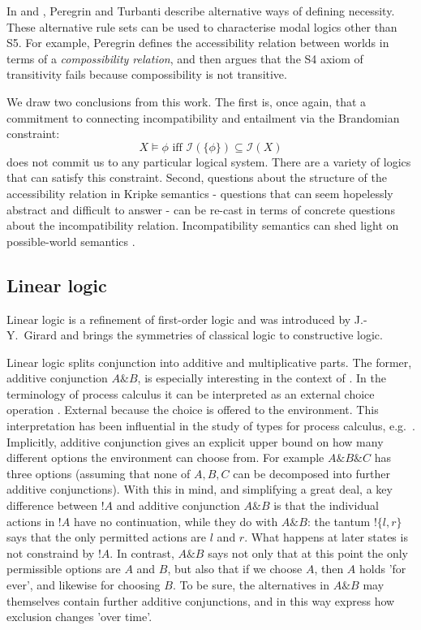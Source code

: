 In \cite{PeregrinJ:logbasoi} and \cite{turbanti}, Peregrin and Turbanti describe alternative ways of defining necessity.
These alternative rule sets can be used to characterise modal logics other than S5.
For example, Peregrin defines the accessibility relation between worlds in terms of a \emph{compossibility relation}, and then argues that the S4 axiom of transitivity fails because compossibility is not transitive.

We draw two conclusions from this work.
The first is, once again, that a commitment to connecting incompatibility and entailment via the Brandomian constraint:
\[
X \models \phi \text{ iff } \mathcal{I}(\{\phi\}) \subseteq \mathcal{I}(X)
\]
does not commit us to any particular logical system. 
There are a variety of logics that can satisfy this constraint.
Second, questions about the structure of the accessibility relation in Kripke semantics - questions that can seem hopelessly abstract and difficult to answer - can be re-cast in terms of concrete questions about the incompatibility relation.
Incompatibility semantics can shed light on possible-world semantics \cite{turbanti}. 

\subsection{Linear logic}

Linear logic \cite{GirardJY:linlog,GirardJY:protyp} is a refinement of
first-order logic and was introduced by J.-Y.~Girard and
brings the symmetries of classical logic to constructive
logic. 

Linear logic splits conjunction into additive and multiplicative
parts. The former, additive conjunction $A \& B$, is especially
interesting in the context of \cathoristic{}. In the terminology of
process calculus it can be interpreted as an external choice operation
\cite{AbramskyS:comintoll}. External because the choice is offered to
the environment.  This interpretation has been influential in the
study of types for process calculus,
e.g.~\cite{HondaK:unitypsfsifLONG,TakeuchiK:intbaslaits,HondaK:lanpriatdfscbp}.
Implicitly, additive conjunction gives an explicit upper bound on how
many different options the environment can choose from. For example 
$A \& B \& C$ has  three options (assuming that none of $A, B, C$
can be decomposed into further additive conjunctions).  With this in
mind, and simplifying a great deal, a key difference between $!A$ and
additive conjunction $A \& B$ is that the individual actions in $!A$
have no continuation, while they do with $A \& B$: the tantum $!\{l, r\}$ says
that the only permitted  actions are $l$ and $r$. What
happens at later states is not constraind by $!A$.  In contrast, $A \&
B$ says not only that at this point the only permissible options are $A$
and $B$, but also that if we choose $A$, then $A$ holds 'for ever',
and likewise for choosing $B$. To be sure, the alternatives in $A \&
B$ may themselves contain further additive conjunctions, and in this
way express how exclusion changes 'over time'.

